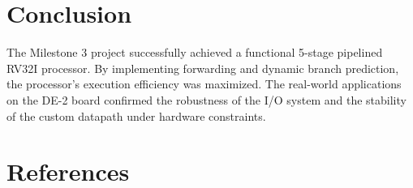\newpage
\section{Conclusion}
The Milestone 3 project successfully achieved a functional 5-stage pipelined RV32I processor. By implementing forwarding and dynamic branch prediction, the processor's execution efficiency was maximized. The real-world applications on the DE-2 board confirmed the robustness of the I/O system and the stability of the custom datapath under hardware constraints.

\newpage
\section*{References}